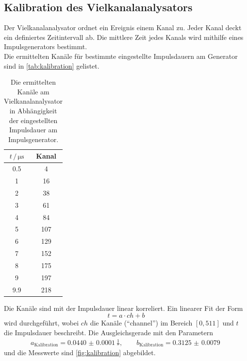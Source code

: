 \subsection{Kalibration des Vielkanalanalysators}
Der Vielkanalanalysator ordnet ein Ereignis einem Kanal zu.
Jeder Kanal deckt ein definiertes Zeitintervall ab.
Die mittlere Zeit jedes Kanals wird mithilfe eines Impulsgenerators bestimmt.
\\
Die ermittelten Kanäle für bestimmte eingestellte Impulsdauern am Generator sind in \autoref{tab:kalibration} gelistet.
\begin{table}
    \centering
    \caption{Die ermittelten Kanäle am Vielkanalanalysator in Abhängigkeit der eingestellten Impulsdauer am Impulsgenerator.}
    \label{tab:kalibration}
    \begin{tabular}{cc}
        \toprule
        $t \,/\, \unit{\micro\second}$ & Kanal \\
        \midrule
        0.5 & 4 \\
        1 & 16 \\
        2 & 38 \\
        3 & 61 \\
        4 & 84 \\
        5 & 107 \\
        6 & 129 \\
        7 & 152 \\
        8 & 175 \\
        9 & 197 \\
        9.9 & 218 \\
        \bottomrule
    \end{tabular}
\end{table}
Die Kanäle sind mit der Impulsdauer linear korreliert.
Ein linearer Fit der Form
\begin{equation}
    t = a \cdot ch + b
    \label{eqn:fit_kanal}
\end{equation}
wird durchgeführt, wobei $ch$ die Kanäle ("`channel"') im Bereich $[0, 511]$ und $t$ die Impulsdauer beschreibt.
Die Ausgleichsgerade mit den Parametern
\begin{align*}
    a_\text{Kalibration} = \qty{0.0440(00001)}{\frac{1}{\second}}, \qquad b_\text{Kalibration} = \qty{0.3125(00079)}{}
\end{align*}
und die Messwerte sind \autoref{fig:kalibration} abgebildet.
